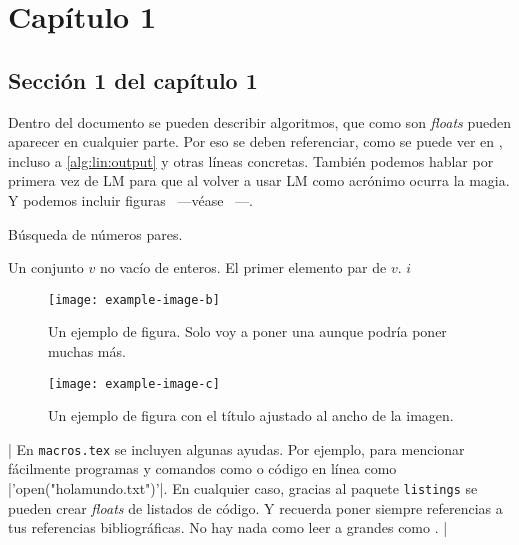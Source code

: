 \chapter{Capítulo 1}\label{ch:capitulo}

\section{Sección 1 del capítulo 1}\label{sec:seccion}

Dentro del documento se pueden describir algoritmos, que como son \emph{floats}
pueden aparecer en cualquier parte. Por eso se deben referenciar, como se puede ver
en , incluso a \autoref{alg:lin:output} y otras
líneas concretas. También podemos hablar por primera vez de \ac{LM} para que al volver
a usar \ac{LM} como acrónimo ocurra la magia. Y podemos incluir figuras ~---véase ~---.

\begin{algorithm}
\caption{Búsqueda de números pares.}\label{alg:algoritmoRaro}
\begin{algorithmic}[1]
\REQUIRE Un conjunto $v$ no vacío de enteros.
\ENSURE El primer elemento par de $v$.
\label{alg:lin:output}
\RETURN $i$
\ENDIF
\ENDFOR
\end{algorithmic}
\end{algorithm}

\begin{figure}
  \centering
  \texttt{[image: example-image-b]}
  \caption{Un ejemplo de figura. Solo voy a poner una aunque podría poner muchas más.}
  \label{fig:unaFigura}
\end{figure}

\begin{figure}
  \centering
  \begin{figuredefinescaptionwidth}
    \texttt{[image: example-image-c]}
  \end{figuredefinescaptionwidth}
  \caption{Un ejemplo de figura con el título ajustado al ancho de la imagen.}
  \label{fig:otraFigura}
\end{figure}

\lstCppMakeShortInline|
En \texttt{macros.tex} se incluyen algunas ayudas. Por ejemplo, para mencionar
fácilmente programas y comandos como \Matlab o código en línea como
|'open("holamundo.txt")'|. En cualquier caso, gracias al paquete \texttt{listings}
se pueden crear \emph{floats} de listados de código. Y recuerda poner siempre
referencias a tus referencias bibliográficas. No hay nada como leer a grandes como
\cite{Torres2009}.
\lstDeleteShortInline|

\Blindtext
